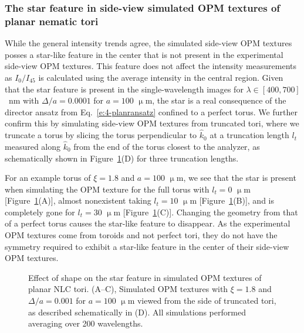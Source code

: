 \subsubsection{The star feature in side-view simulated OPM textures of planar nematic tori}
While the general intensity trends agree, the simulated side-view OPM textures posses a star-like feature in the center that is not present in the experimental side-view OPM textures.
This feature does not affect the intensity measurements as $I_0/I_{45}$ is calculated using the average intensity in the central region.
Given that the star feature is present in the single-wavelength images for $\lambda \in [400,700]$~nm with $\Delta/a = 0.0001$ for $a = 100$ $\upmu$m, the star is a real consequence of the director ansatz from Eq.~\ref{e:4-planransatz} confined to a perfect torus.
We further confirm this by simulating side-view OPM textures from truncated tori, where we truncate a torus by slicing the torus perpendicular to $\hat{k}_0$ at a truncation length $l_t$ measured along $\hat{k}_0$ from the end of the torus closest to the analyzer, as schematically shown in Figure~\ref{f:4-nostar}(D) for three truncation lengths.

For an example torus of $\xi=1.8$ and $a = 100$ $\upmu$m, we see that the star is present when simulating the OPM texture for the full torus with $l_t=0$ $\upmu$m [Figure~\ref{f:4-nostar}(A)], almost nonexistent taking $l_t=10$ $\upmu$m [Figure~\ref{f:4-nostar}(B)], and is completely gone for $l_t=30$ $\upmu$m [Figure~\ref{f:4-nostar}(C)].
Changing the geometry from that of a perfect torus causes the star-like feature to disappear.
As the experimental OPM textures come from toroids and not perfect tori, they do not have the symmetry required to exhibit a star-like feature in the center of their side-view OPM textures.
\begin{figure}
\centering
\caption{Effect of shape on the star feature in simulated OPM textures of planar NLC tori.
(A--C), Simulated OPM textures with $\xi = 1.8$ and $\Delta /a = 0.001$ for $a = 100$ $\upmu$m viewed from the side of truncated tori, as described schematically in (D).
All simulations performed averaging over 200 wavelengths.}\label{f:4-nostar}
\end{figure}


